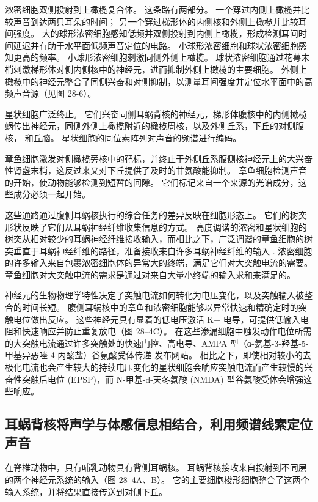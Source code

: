 浓密细胞双侧投射到上橄榄复合体。 这条路有两部分。 一个穿过内侧上橄榄并比较声音到达两只耳朵的时间； 另一个穿过梯形体的内侧核和外侧上橄榄并比较耳间强度。 大的球形浓密细胞感知低频并双侧投射到内侧上橄榄，形成检测耳间时间延迟并有助于水平面低频声音定位的电路。 小球形浓密细胞和球状浓密细胞感知更高的频率。 小球形浓密细胞刺激同侧外侧上橄榄。 球状浓密细胞通过花萼末梢刺激梯形体对侧内侧核中的神经元，进而抑制外侧上橄榄的主要细胞。 外侧上橄榄中的神经元整合了同侧兴奋和对侧抑制，以测量耳间强度并定位水平面中的高频声音源（见图 28-6）。

星状细胞广泛终止。 它们兴奋同侧耳蜗背核的神经元，梯形体腹核中的内侧橄榄蜗传出神经元，同侧外侧上橄榄附近的橄榄周核，以及外侧丘系，下丘的对侧腹核， 和丘脑。 星状细胞的同位素阵列对声音的频谱进行编码。

章鱼细胞激发对侧橄榄旁核中的靶标，并终止于外侧丘系腹侧核神经元上的大兴奋性肾盏末梢，这反过来又对下丘提供了及时的甘氨酸能抑制。 章鱼细胞检测声音的开始，使动物能够检测到短暂的间隙。 它们标记来自一个来源的光谱成分，这些成分必须一起开始。

这些通路通过腹侧耳蜗核执行的综合任务的差异反映在细胞形态上。 它们的树突形状反映了它们从耳蜗神经纤维收集信息的方式。 高度调谐的浓密和星状细胞的树突从相对较少的耳蜗神经纤维接收输入，而相比之下，广泛调谐的章鱼细胞的树突垂直于耳蜗神经纤维的路径，准备接收来自许多耳蜗神经纤维的输入 . 浓密细胞的许多输入来自包裹浓密细胞体的异常大的终端，满足它们对大突触电流的需要。 章鱼细胞对大突触电流的需求是通过对来自大量小终端的输入求和来满足的。

神经元的生物物理学特性决定了突触电流如何转化为电压变化，以及突触输入被整合的时间长短。 腹侧耳蜗核中的章鱼和浓密细胞能够以异常快速和精确定时的突触电位做出反应。 这些神经元具有显着的低电压激活 K+ 电导，可提供低输入电阻和快速响应并防止重复放电（图 28–4C）。 在这些渗漏细胞中触发动作电位所需的大突触电流通过许多突触处的快速门控、高电导、AMPA 型（α-氨基-3-羟基-5-甲基异恶唑-4-丙酸盐）谷氨酸受体传递 发布网站。 相比之下，即使相对较小的去极化电流也会产生较大的持续电压变化的星状细胞会响应突触电流而产生较慢的兴奋性突触后电位 (EPSP)，而 N-甲基-d-天冬氨酸 (NMDA) 型谷氨酸受体会增强这些响应。


\subsection{耳蜗背核将声学与体感信息相结合，利用频谱线索定位声音}

在脊椎动物中，只有哺乳动物具有背侧耳蜗核。 耳蜗背核接收来自投射到不同层的两个神经元系统的输入（图 28–4A、B）。 它的主要细胞梭形细胞整合了这两个输入系统，并将结果直接传送到对侧下丘。

